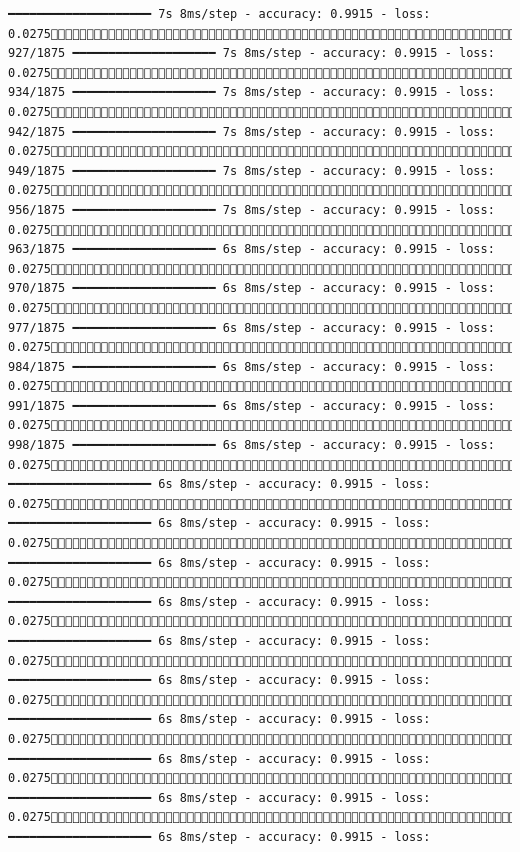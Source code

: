\documentclass[
  letterpaper,
  DIV=11,
  numbers=noendperiod]{scrreprt}
\begin{document}
\begin{verbatim}
━━━━━━━━━━━━━━━━━━━━ 7s 8ms/step - accuracy: 0.9915 - loss: 0.0275 927/1875 ━━━━━━━━━━━━━━━━━━━━ 7s 8ms/step - accuracy: 0.9915 - loss: 0.0275 934/1875 ━━━━━━━━━━━━━━━━━━━━ 7s 8ms/step - accuracy: 0.9915 - loss: 0.0275 942/1875 ━━━━━━━━━━━━━━━━━━━━ 7s 8ms/step - accuracy: 0.9915 - loss: 0.0275 949/1875 ━━━━━━━━━━━━━━━━━━━━ 7s 8ms/step - accuracy: 0.9915 - loss: 0.0275 956/1875 ━━━━━━━━━━━━━━━━━━━━ 7s 8ms/step - accuracy: 0.9915 - loss: 0.0275 963/1875 ━━━━━━━━━━━━━━━━━━━━ 6s 8ms/step - accuracy: 0.9915 - loss: 0.0275 970/1875 ━━━━━━━━━━━━━━━━━━━━ 6s 8ms/step - accuracy: 0.9915 - loss: 0.0275 977/1875 ━━━━━━━━━━━━━━━━━━━━ 6s 8ms/step - accuracy: 0.9915 - loss: 0.0275 984/1875 ━━━━━━━━━━━━━━━━━━━━ 6s 8ms/step - accuracy: 0.9915 - loss: 0.0275 991/1875 ━━━━━━━━━━━━━━━━━━━━ 6s 8ms/step - accuracy: 0.9915 - loss: 0.0275 998/1875 ━━━━━━━━━━━━━━━━━━━━ 6s 8ms/step - accuracy: 0.9915 - loss: 0.02751004/1875 ━━━━━━━━━━━━━━━━━━━━ 6s 8ms/step - accuracy: 0.9915 - loss: 0.02751011/1875 ━━━━━━━━━━━━━━━━━━━━ 6s 8ms/step - accuracy: 0.9915 - loss: 0.02751017/1875 ━━━━━━━━━━━━━━━━━━━━ 6s 8ms/step - accuracy: 0.9915 - loss: 0.02751023/1875 ━━━━━━━━━━━━━━━━━━━━ 6s 8ms/step - accuracy: 0.9915 - loss: 0.02751030/1875 ━━━━━━━━━━━━━━━━━━━━ 6s 8ms/step - accuracy: 0.9915 - loss: 0.02751037/1875 ━━━━━━━━━━━━━━━━━━━━ 6s 8ms/step - accuracy: 0.9915 - loss: 0.02751044/1875 ━━━━━━━━━━━━━━━━━━━━ 6s 8ms/step - accuracy: 0.9915 - loss: 0.02751051/1875 ━━━━━━━━━━━━━━━━━━━━ 6s 8ms/step - accuracy: 0.9915 - loss: 0.02751058/1875 ━━━━━━━━━━━━━━━━━━━━ 6s 8ms/step - accuracy: 0.9915 - loss: 0.02751065/1875 ━━━━━━━━━━━━━━━━━━━━ 6s 8ms/step - accuracy: 0.9915 - loss: 
\end{verbatim}
\end{document}
